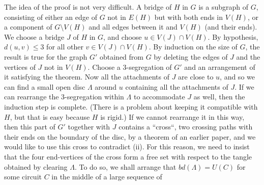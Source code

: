 The idea of the proof is not very difficult. A bridge of $H$ in $G$ is a subgraph of $G$, consisting of either an edge of $G$ not in $E(H)$ but with both ends in $V(H)$, or a component of $G \setminus V(H)$ and all edges between it and $V(H)$ (and their ends). We choose a bridge $J$ of $H$ in $G$, and choose $u \in V(J) \cap V(H)$. By hypothesis, $d(u, v) \le 3$ for all other $v \in V(J) \cap V(H)$. By induction on the size of $G$, the result is true for the graph $G'$ obtained from $G$ by deleting the edges of $J$ and the vertices of $J$ not in $V(H)$. Choose a 3-segregation of $G'$ and an arrangement of it satisfying the theorem. Now all the attachments of $J$ are close to $u$, and so we can find a small open disc $\Lambda$ around $u$ containing all the attachments of $J$. If we can rearrange the 3-segregation within $\Lambda$ to accommodate $J$ as well, then the induction step is complete. (There is a problem about keeping it compatible with $H$, but that is easy because $H$ is rigid.) If we cannot rearrange it in this way, then this part of $G'$ together with $J$ contains a ``cross``, two crossing paths with their ends on the boundary of the disc, by a theorem of an earlier paper, and we would like to use this cross to contradict (ii). For this reason, we need to insist that the four end-vertices of the cross form a free set with respect to the tangle obtained by clearing $\Lambda$. To do so, we shall arrange that $bd(\Lambda) = U(C)$ for some circuit $C$ in the middle of a large sequence of
